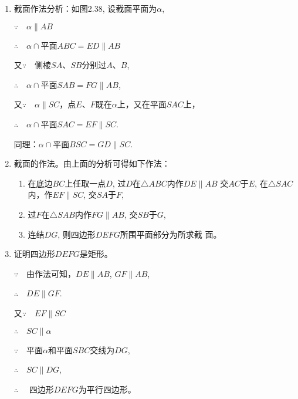 \begin{figure}[htp]
    \centering
\begin{tikzpicture}
    
\end{tikzpicture}
    \caption{}
\end{figure}

\begin{solution}
\begin{enumerate}
    \item 截面作法分析：如图2.38, 设截面平面为$\alpha$, 
    
$\because\quad \alpha\parallel AB$

$\therefore\quad \alpha\cap$平面$ABC=ED\parallel AB$

又$\because\quad $侧棱$SA$、$SB$分别过$A$、$B$,

$\therefore\quad \alpha\cap$平面$SAB=FG\parallel AB$,

又$\because\quad \alpha\parallel SC$，点$E$、$F$既在$\alpha$上，又在平面$SAC$上，

$\therefore\quad \alpha\cap$平面$SAC=EF\parallel SC$.

同理：$\alpha\cap$平面$BSC=GD\parallel SC$.

\item 截面的作法。由上面的分析可得如下作法：
\begin{enumerate}
    \item 在底边$BC$上任取一点$D$, 过$D$在$\triangle ABC$内作$DE\parallel AB$
    交$AC$于$E$, 在$\triangle SAC$内，作$EF\parallel SC$, 交$SA$于$F$,
    \item  过$F$在$\triangle SAB$内作$FG\parallel AB$, 交$SB$于$G$, 
    \item 连结$DG$, 则四边形$DEFG$所围平面部分为所求截
    面。
\end{enumerate}

\item 证明四边形$DEFG$是矩形。


$\because\quad $由作法可知，$DE\parallel AB$, $GF\parallel AB$, 

$\therefore\quad DE\parallel GF$.

又$\because\quad EF\parallel SC$

$\therefore\quad SC\parallel \alpha$

$\because\quad $平面$\alpha$和平面$SBC$交线为$DG$,

$\therefore\quad SC\parallel DG$,

$\therefore\quad$ 四边形$DEFG$为平行四边形。


\end{enumerate}
\end{solution}
